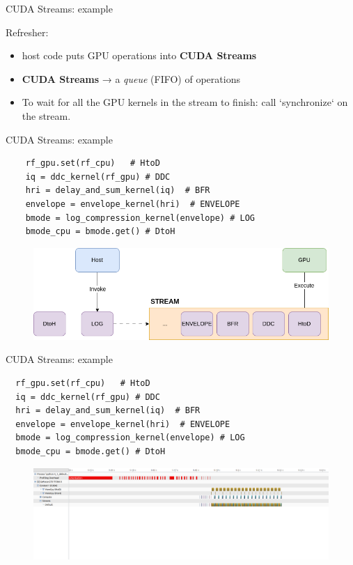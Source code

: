 \documentclass[xcolor=table]{beamer}
\begin{document}
\begin{frame}[fragile]{CUDA Streams: example}

  Refresher:
  \begin{itemize}
  \item host code puts GPU operations into \textbf{CUDA Streams}
  \item \textbf{CUDA Streams} → a \emph{queue} (FIFO) of operations
  \item  To wait for all the GPU kernels in the stream to finish: call
    `synchronize` on the stream.
  \end{itemize}

\end{frame}


\begin{frame}[fragile]{CUDA Streams: example}

\begin{lstlisting}
    rf_gpu.set(rf_cpu)   # HtoD
    iq = ddc_kernel(rf_gpu) # DDC
    hri = delay_and_sum_kernel(iq)  # BFR
    envelope = envelope_kernel(hri)  # ENVELOPE
    bmode = log_compression_kernel(envelope) # LOG
    bmode_cpu = bmode.get() # DtoH
\end{lstlisting}

  \begin{figure}
    \includegraphics[scale=0.4]{imgs/stream_queue.png}
  \end{figure}  

\end{frame}


\begin{frame}[fragile]{CUDA Streams: example}


\begin{lstlisting}
  rf_gpu.set(rf_cpu)   # HtoD
  iq = ddc_kernel(rf_gpu) # DDC
  hri = delay_and_sum_kernel(iq)  # BFR
  envelope = envelope_kernel(hri)  # ENVELOPE
  bmode = log_compression_kernel(envelope) # LOG
  bmode_cpu = bmode.get() # DtoH
\end{lstlisting}


  \begin{figure}
    \includegraphics[scale=0.2]{imgs/single_stream.png}
  \end{figure}  

\end{frame}
\end{document}
